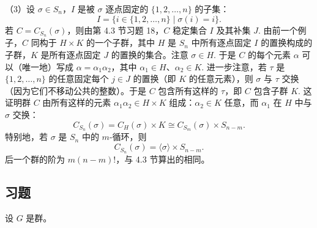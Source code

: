\begin{example}
（3）设 \(\sigma \in S_n\)，\(I\) 是被 \(\sigma\) 逐点固定的 \(\{1, 2, \ldots, n\}\) 的子集：
\[
I = \{i \in \{1, 2, \ldots, n\} \mid \sigma(i) = i\}.
\]
若 \(C = C_{S_n}(\sigma)\)，则由第 4.3 节习题 18，\(C\) 稳定集合 \(I\) 及其补集 \(J\). 由前一个例子，\(C\) 同构于 \(H \times K\) 的一个子群，其中 \(H\) 是 \(S_n\) 中所有逐点固定 \(I\) 的置换构成的子群，\(K\) 是所有逐点固定 \(J\) 的置换的集合。注意 \(\sigma \in H\). 于是 \(C\) 的每个元素 \(\alpha\) 可以（唯一地）写成 \(\alpha = \alpha_1\alpha_2\)，其中 \(\alpha_1 \in H\)、\(\alpha_2 \in K\). 进一步注意，若 \(\tau\) 是 \(\{1, 2, \ldots, n\}\) 的任意固定每个 \(j \in J\) 的置换（即 \(K\) 的任意元素），则 \(\sigma\) 与 \(\tau\) 交换（因为它们不移动公共的整数）。于是 \(C\) 包含所有这样的 \(\tau\)，即 \(C\) 包含子群 \(K\). 这证明群 \(C\) 由所有这样的元素 \(\alpha_1\alpha_2 \in H \times K\) 组成：\(\alpha_2 \in K\) 任意，而 \(\alpha_1\) 在 \(H\) 中与 \(\sigma\) 交换：
\[
C_{S_n}(\sigma) = C_H(\sigma) \times K \cong C_{S_m}(\sigma) \times S_{n-m}.
\]
特别地，若 \(\sigma\) 是 \(S_n\) 中的 \(m\)-循环，则
\[
C_{S_n}(\sigma) = \langle \sigma \rangle \times S_{n-m}.
\]
后一个群的阶为 \(m(n-m)!\)，与 4.3 节算出的相同。
\end{example}

\subsection*{习题}
设 \(G\) 是群。

